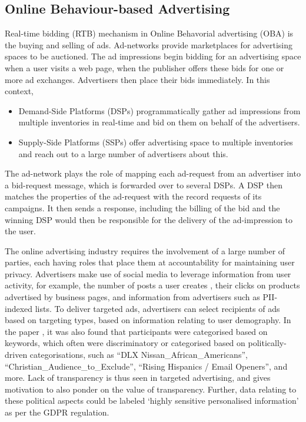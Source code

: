 \documentclass[sigconf,nonacm]{acmart}
\begin{document}
\subsection{Online Behaviour-based Advertising}
Real-time bidding (RTB) mechanism in Online Behavorial advertising (OBA) is the buying and selling of ads. Ad-networks provide marketplaces for advertising spaces to be auctioned. The ad impressions begin bidding for an advertising space when a user visits a web page, when the publisher offers these bids for one or more ad exchanges. Advertisers then place their bids immediately. In this context,
\begin{itemize}
    \item Demand-Side Platforms (DSPs) programmatically gather ad impressions from multiple inventories in real-time and bid on them on behalf of the advertisers. 
    \item Supply-Side Platforms (SSPs) offer advertising space to multiple inventories and reach out to a large number of advertisers about this. 
\end{itemize}
The ad-network plays the role of mapping each ad-request from an advertiser into a bid-request message, which is forwarded over to several DSPs. A DSP then matches the properties of the ad-request with the record requests of its campaigns. It then sends a response, including the billing of the bid and the winning DSP would then be responsible for the delivery of the ad-impression to the user. 

The online advertising industry requires the involvement of a large number of parties, each having roles that place them at accountability for maintaining user privacy. Advertisers make use of social media to leverage information from user activity, for example, the number of posts a user creates \cite{whattwitterknows}, their clicks on products advertised by business pages, and information from advertisers such as PII-indexed lists. To deliver targeted ads, advertisers can select recipients of ads based on targeting types, based on information relating to user demography. In the paper \cite{whattwitterknows}, it was also found that participants were categorised based on keywords, which often were discriminatory or categorised based on politically-driven categorisations, such as  “DLX Nissan\_African\_Americans”, “Christian\_Audience\_to\_Exclude”, “Rising Hispanics / Email Openers”, and more. Lack of transparency is thus seen in targeted advertising, and gives motivation to also ponder on the value of transparency. Further, data relating to these political aspects could be labeled ‘highly sensitive personalised information’ as per the GDPR regulation.
\end{document}
